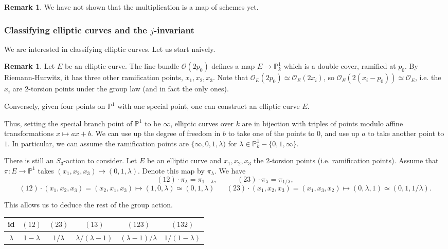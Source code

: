 \documentclass[10pt]{article}
\theoremstyle{definition}
\newtheorem{rmk}[thm]{Remark}
\newcommand{\PP}{\mathbb{P}}
\newcommand{\OO}{\mathcal{O}}
\begin{document}
\begin{rmk}
We have not shown that the multiplication is a map of schemes yet.
\end{rmk}

\subsubsection{Classifying elliptic curves and the $j$-invariant}

We are interested in classifying elliptic curves.  Let us start naively.

\begin{rmk}
Let $E$ be an elliptic curve.  The line bundle $\OO(2p_0)$ defines a map $E \rightarrow \PP^1_k$ which is a double cover, ramified at $p_0$.  By Riemann-Hurwitz, it has three other ramification points, $x_1, x_2, x_3$.  Note that $\OO_E(2p_0) \simeq \OO_E(2x_i)$, so $\OO_E(2(x_i-p_0)) \simeq \OO_E$, i.e. the $x_i$ are 2-torsion points under the group law (and in fact the only ones).

Conversely, given four points on $\PP^1$ with one special point, one can construct an elliptic curve $E$.
\end{rmk}

Thus, setting the special branch point of $\PP^1$ to be $\infty$, elliptic curves over $k$ are in bijection with triples of points modulo affine transformations $x \mapsto ax + b$.  We can use up the degree of freedom in $b$ to take one of the points to $0$, and use up $a$ to take another point to $1$.  In particular, we can assume the ramification points are $\{\infty, 0, 1, \lambda)$ for $\lambda \in \PP^1_k - \{0, 1, \infty\}$.  

There is still an $S_3$-action to consider.  Let $E$ be an elliptic curve and $x_1, x_2, x_3$ the 2-torsion points (i.e. ramification points).  Assume that $\pi: E \rightarrow \PP^1$ takes $(x_1, x_2, x_3) \mapsto (0, 1, \lambda)$.  Denote this map by $\pi_\lambda$.  We have
$$(12) \cdot \pi_\lambda = \pi_{1-\lambda}, \;\;\;\;\;\;\;\;\;\; (23) \cdot \pi_\lambda = \pi_{1/\lambda},$$
$$(12) \cdot (x_1, x_2, x_3) = (x_2, x_1, x_3) \mapsto (1, 0, \lambda) \simeq (0, 1, \lambda) \;\;\;\;\;\; (23) \cdot (x_1, x_2, x_3) = (x_1, x_3, x_2) \mapsto (0, \lambda, 1) \simeq (0, 1, 1/\lambda).$$

This allows us to deduce the rest of the group action.
\begin{center}
\begin{tabular}{|c|c|c|c|c|c|} \hline
id & $(12)$ & $(23)$ & $(13)$ & $(123)$ & $(132)$ \\ \hline
$\lambda$ & $1-\lambda$ & $1/\lambda$ & $\lambda/(\lambda - 1)$ & $(\lambda - 1)/\lambda$ & $1/(1 - \lambda)$ \\ \hline
\end{tabular}
\end{center}
\end{document}
